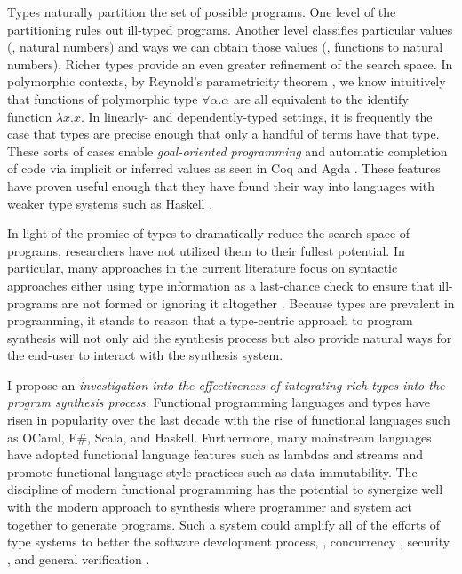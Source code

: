 Types naturally partition the set of possible programs.  One level of the
partitioning rules out ill-typed programs.  Another level classifies particular
values (\eg, natural numbers) and ways we can obtain those values (\eg,
functions to natural numbers).  Richer types provide an even greater refinement
of the search space.  In polymorphic contexts, by Reynold's parametricity
theorem \cite{wadler-fpca-1989}, we know intuitively that functions of
polymorphic type $\forall \alpha. \alpha$ are all equivalent to the identify
function $\lambda x.  x$.  In linearly- and dependently-typed settings, it is
frequently the case that types are precise enough that only a handful of terms
have that type.  These sorts of cases enable \emph{goal-oriented programming}
and automatic completion of code via implicit or inferred values
\cite{oliveira-pldi-2012} as seen in Coq \cite{coq-2012} and Agda
\cite{mcbride-icfp-2012}.  These features have proven useful enough that they
have found their way into languages with weaker type systems such as Haskell
\cite{ghc-typed-holes}.

In light of the promise of types to dramatically reduce the search space of
programs, researchers have not utilized them to their fullest potential.  In
particular, many approaches in the current literature \cite{alur-fmcad-2013}
focus on syntactic approaches either using type information as a last-chance
check to ensure that ill-programs are not formed or ignoring it altogether
\cite{singh-pldi-2013}.  Because types are prevalent in programming, it stands
to reason that a type-centric approach to program synthesis will not only aid
the synthesis process but also provide natural ways for the end-user to interact
with the synthesis system.

I propose an \emph{investigation into the effectiveness of integrating rich
types into the program synthesis process}.  Functional programming languages and
types have risen in popularity over the last decade with the rise of
functional languages such as OCaml, F\#, Scala, and Haskell.
Furthermore, many mainstream languages have adopted functional language features
such as lambdas and streams and promote functional language-style practices such
as data immutability.  The discipline of modern functional programming has the
potential to synergize well with the modern approach to synthesis where
programmer and system act together to generate programs.  Such a system could
amplify all of the efforts of type systems to better the software development
process, \eg, concurrency \cite{mazurak-icfp-2010}, security
\cite{jia-icfp-2008}, and general verification \cite{mckinna-popl-2006,
rondon-popl-2010}.


